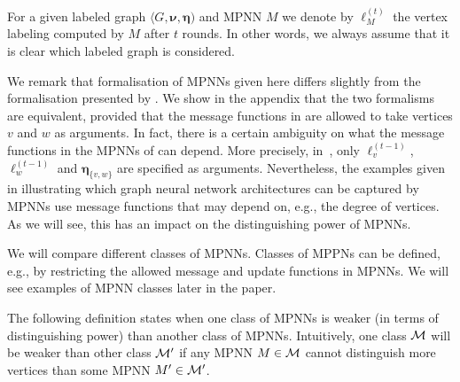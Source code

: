 


\newpage


For a given labeled graph $\langle G,\pmb{\nu},\pmb{\eta})$ and MPNN $M$ we denote by 
$\pmb{\ell}_M^{(t)}$ the vertex labeling computed by $M$ after $t$ rounds. In other words, we always assume that it is clear which labeled graph is considered.

We remark that formalisation of MPNNs given here differs slightly from the formalisation presented by \cite{GilmerSRVD17}. We show in the appendix that the two formalisms are equivalent, provided that the message functions in \cite{GilmerSRVD17} are allowed to take vertices $v$ and $w$ as arguments. In fact, there is a certain ambiguity on what the message functions in the MPNNs of \cite{GilmerSRVD17} can depend. More precisely, in~\cite{GilmerSRVD17}, only $\pmb{\ell}_v^{(t-1)}$, $\pmb{\ell}_w^{(t-1)}$ and $\pmb{\eta}_{\{v,w\}}$ are specified as arguments. Nevertheless, the examples given in  \cite{GilmerSRVD17} illustrating which graph neural network architectures can be captured by MPNNs use message functions that may depend on, e.g., the degree  of vertices. As we will see, this has an impact on the distinguishing power of MPNNs.

We will compare different classes of MPNNs.  Classes of MPPNs can be defined, e.g., by restricting the allowed message and update functions in MPNNs. We will see  examples of MPNN classes later in the paper. 

The following definition states when one class of MPNNs is weaker (in terms of distinguishing power) than another class of MPNNs. Intuitively, one class $\mathcal{M}$ will be weaker than other class $\mathcal{M}'$ if any MPNN $M\in\mathcal{M}$ cannot distinguish more vertices than some MPNN $M'\in\mathcal{M}'$.

